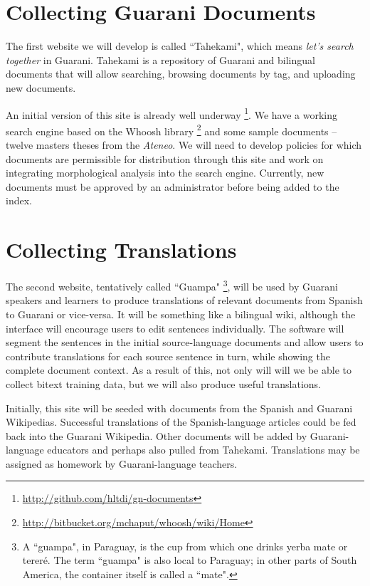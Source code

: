 \section{Collecting Guarani Documents}
The first website we will develop is called ``Tahekami", which means
\emph{let's search together} in Guarani.
Tahekami is a repository of Guarani and bilingual documents that will allow
searching, browsing documents by tag, and uploading new documents.

An initial version of this site is already well underway
\footnote{\url{http://github.com/hltdi/gn-documents}}.  We have a working
search engine based on the Whoosh library
\footnote{\url{http://bitbucket.org/mchaput/whoosh/wiki/Home}} and some sample
documents -- twelve masters theses from the \emph{Ateneo}. We will need to
develop policies for which documents are permissible for distribution through
this site and work on integrating morphological analysis into the search
engine. Currently, new documents must be approved by an administrator before
being added to the index.

\section{Collecting Translations}
The second website, tentatively called ``Guampa"
\footnote{A ``guampa", in Paraguay, is the cup from which one drinks yerba mate
or tereré. The term ``guampa" is also local to Paraguay; in other parts of
South America, the container itself is called a ``mate".},
will be used by Guarani speakers and learners to produce translations of
relevant documents from Spanish to Guarani or vice-versa.
It will be something like a bilingual wiki, although the interface will
encourage users to edit sentences individually.
The software will segment the sentences in the initial
source-language documents and allow users to contribute translations for each
source sentence in turn, while showing the complete document context.
As a result of this, not only will will we be able to collect bitext training
data, but we will also produce useful translations.

Initially, this site will be seeded with documents from the Spanish and Guarani
Wikipedias. Successful translations of the Spanish-language articles could be
fed back into the Guarani Wikipedia. Other documents will be added by
Guarani-language educators and perhaps also pulled from Tahekami. Translations
may be assigned as homework by Guarani-language teachers.

